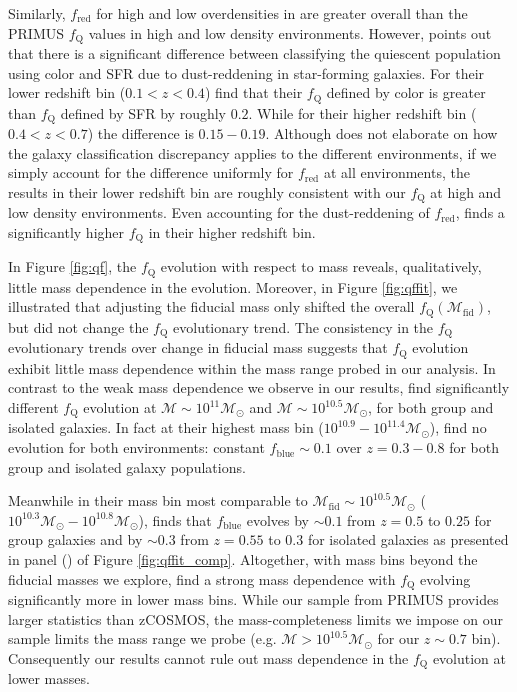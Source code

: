 \documentclass{emulateapj}
\begin{document}
Similarly, $f_{\mathrm{red}}$ for high and low overdensities in
\cite{Kovac:2014aa} are  greater overall than the PRIMUS $f_{\mathrm{Q}}$
values in high and low density environments. However,
\cite{Kovac:2014aa} points out that there is a significant difference
between classifying the quiescent population using color and SFR due to dust-reddening in star-forming galaxies. For their lower redshift bin ($0.1 < z < 0.4$) \cite{Kovac:2014aa} find that their $f_{\mathrm{Q}}$ defined by color is greater than $f_{\mathrm{Q}}$ defined by SFR by roughly $0.2$. While for their higher redshift bin ($0.4 < z < 0.7$) the difference is $0.15-0.19$. Although \cite{Kovac:2014aa} does not elaborate on how the galaxy classification discrepancy applies to the different environments, if we simply account for the difference uniformly for $f_{\mathrm{red}}$ at all environments, the \cite{Kovac:2014aa} results in their lower redshift bin are roughly consistent with our $f_{\mathrm{Q}}$ at high and low density environments. Even accounting for the dust-reddening of $f_{\mathrm{red}}$, \cite{Kovac:2014aa} finds a significantly higher $f_{\mathrm{Q}}$ in their higher redshift bin. 

In Figure \ref{fig:qf}, the $f_{\mathrm{Q}}$ evolution with respect to
mass reveals, qualitatively, little mass dependence in the
evolution. Moreover, in Figure \ref{fig:qffit}, we illustrated that
adjusting the fiducial mass only shifted the overall
$f_{\mathrm{Q}}(\mathcal{M}_{\mathrm{fid}})$, but did not change the
$f_{\mathrm{Q}}$ evolutionary trend. The consistency in the $f_{\mathrm{Q}}$
evolutionary trends over change in fiducial mass suggests that
$f_{\mathrm{Q}}$ evolution exhibit little mass dependence within the 
mass range probed in our analysis. In contrast to
the weak mass dependence we observe in our results,
\cite{Iovino:2010aa} find significantly different $f_{\mathrm{Q}}$
evolution at $\mathcal{M} \sim 10^{11} \mathcal{M}_{\odot}$ and
$\mathcal{M} \sim 10^{10.5} \mathcal{M}_{\odot}$, for both group and
isolated galaxies. In fact at their highest mass bin ($10^{10.9} -
10^{11.4} \mathcal{M}_{\odot}$), \cite{Iovino:2010aa} find no evolution
for both environments: constant $f_{\mathrm{blue}} \sim 0.1$ over $z =
0.3 - 0.8$ for both group and isolated galaxy populations.

Meanwhile in their mass bin most comparable to $\mathcal{M}_{\mathrm{fid}}
\sim 10^{10.5} \mathcal{M}_{\odot}$ ($10^{10.3} \mathcal{M}_{\odot} -
10^{10.8} \mathcal{M}_{\odot}$), \cite{Iovino:2010aa} finds that
$f_{\mathrm{blue}}$ evolves by $\sim 0.1$ from $z = 0.5$ to $0.25$ for
group galaxies and by $\sim 0.3$ from $z=0.55$ to $0.3$ for isolated
galaxies as presented in panel (\iovinopanel) of Figure \ref{fig:qffit_comp}. Altogether, with
mass bins beyond the fiducial masses we explore, \cite{Iovino:2010aa}
find a strong mass dependence with $f_{\mathrm{Q}}$ evolving significantly
more in lower mass bins. While our sample from PRIMUS provides larger
statistics than zCOSMOS, the mass-completeness limits we impose on our
sample limits the mass range we probe (e.g. $\mathcal{M} > 10^{10.5}
\mathcal{M}_{\odot}$ for our $z \sim 0.7$ bin). Consequently our
results cannot rule out mass dependence in the $f_{\mathrm{Q}}$ evolution
at lower masses.
\end{document}
